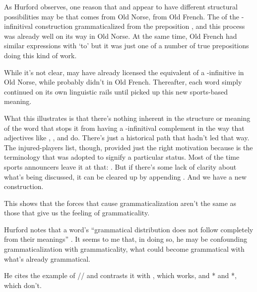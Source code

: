 \bigskip

As Hurford observes, one reason that  and  appear to have different structural possibilities may be that  comes from Old Norse,  from Old French. The  of the -infinitival construction grammaticalized from the preposition , and this process was already well on its way in Old Norse. At the same time, Old French had similar expressions with  `to' but it was just one of a number of true prepositions doing this kind of work.

While it's not clear,  may have already licensed the equivalent of a -infinitive in Old Norse, while  probably didn't in Old French. Thereafter, each word simply continued on its own linguistic rails until  picked up this new sports-based meaning.

What this illustrates is that there's nothing inherent in the structure or meaning of the word  that stops it from having a -infinitival complement in the way that adjectives like , , and  do. There's just a historical path that hadn't led that way. The injured-players list, though, provided just the right motivation because  is the terminology that was adopted to signify a particular status. Most of the time sports announcers leave it at that: . But if there's some lack of clarity about what's being discussed, it can be cleared up by appending . And we have a new construction.

This shows that the forces that cause grammaticalization aren't the same as those that give us the feeling of grammaticality.

Hurford notes that a word's \enquote{grammatical distribution does not follow completely from their meanings} \citep[302]{Hurford2012a}. %
It seems to me that, in doing so, he may be confounding grammaticalization with grammaticality, what could become grammatical with what's already grammatical.

He cites the example of // and contrasts it with , which works, and * and *, which don't.


